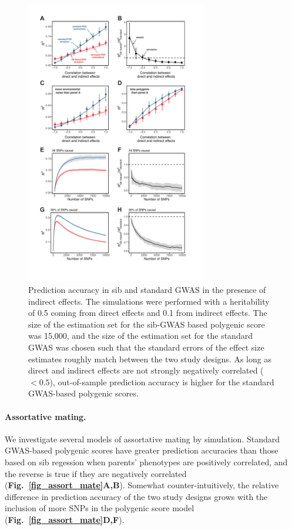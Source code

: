 \documentclass[hidelinks, 12pt]{article}
\begin{document}
\begin{figure}[!h]
\centering
\includegraphics[width=0.7\textwidth]{supp_figures/indirect.pdf}
\caption[Prediction accuracy in sib and standard GWAS in the presence of indirect effects.]{\small Prediction accuracy in sib and standard GWAS in the presence of indirect effects.  The simulations were performed with a heritability of 0.5 coming from direct effects and 0.1 from indirect effects.  The size of the estimation set for the sib-GWAS based polygenic score was 15,000, and the size of the estimation set for the standard GWAS was chosen such that the standard errors of the effect size estimates roughly match between the two study designs. As long as direct and indirect effects are not strongly negatively correlated ($<0.5$), out-of-sample prediction accuracy is higher for the standard GWAS-based polygenic scores.}
\label{fig_R_vs_rho_sims}
\end{figure}

\paragraph{Assortative mating.}  We investigate several models of assortative mating by simulation. Standard GWAS-based polygenic scores have greater prediction accuracies than those based on sib regession when parents' phenotypes are positively correlated, and the reverse is true if they are negatively correlated ({\bf Fig.~\ref{fig_assort_mate}A,B}).  Somewhat counter-intuitively, the relative difference in prediction accuracy of the two study designs grows with the inclusion of more SNPs in the polygenic score model ({\bf Fig.~\ref{fig_assort_mate}D,F}).
\end{document}
